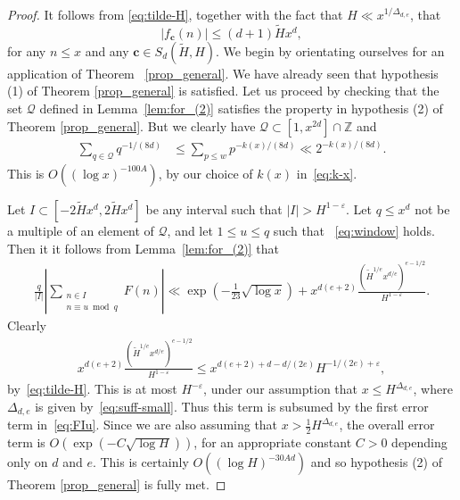 \documentclass[11pt,letterpaper]{amsart}
\renewcommand{\leq}{\leqslant}
\theoremstyle{definition}
\numberwithin{equation}{section}
\renewcommand{\c}{\mathbf{c}}
\newcommand{\ve}{\varepsilon}
\DeclareMathOperator{\n}{N}
\newcommand{\0}{\mathbf{0}}
\begin{document}
\begin{proof}
It follows from 
\eqref{eq:tilde-H}, together with the fact that $H\ll x^{1/\Delta_{d,e}}$,   that 
$$
|f_{\mathbf{c}}(n)|\leq (d+1)\tilde H x^d,
$$ 
for any $n\leq x$ and any $\c\in S_d(\tilde H, H)$.
We begin by orientating ourselves for an application of   Theorem 
~\ref{prop_general}. 
We have already seen that  hypothesis (1)
 of Theorem 
\ref{prop_general} is satisfied. 
Let us proceed by checking that the  set $\mathcal{Q}$ 
defined in Lemma~\ref{lem:for_(2)} satisfies the property in hypothesis (2) of 
Theorem 
\ref{prop_general}. 
But we clearly have 
$\mathcal{Q}\subset [1,x^{2d}]\cap \mathbb{Z}$ and
\begin{align*}
 \sum_{q\in \mathcal{Q}}
q^{-1/(8d)}
&\leq \sum_{p\leq w} p^{-k(x)/(8d)}\ll
2^{-k(x)/(8d)}.
\end{align*}
This is 
$O((\log x)^{-100A})$, by our choice of $k(x)$
in~\eqref{eq:k-x}. 

Let
$I\subset [-2\tilde H x^d, 2\tilde H x^d]$
be any interval  such that $|I|> H^{1-\varepsilon}$.
Let 
 $q\leq x^{d}$ not be  a multiple of an element of $\mathcal{Q}$, and let $1\leq u\leq q$ such that 
~\eqref{eq:window} holds. Then it  it follows from
Lemma~\ref{lem:for_(2)}  that 
\begin{align}\label{eq:FIu}
\frac{q}{|I|}
\left|\sum_{\substack{n\in I\\n\equiv u\bmod q}}F(n)\right|
\ll 
\exp\left(-\tfrac{1}{23}\sqrt{\log x}\right)
+
x^{d(e+2)} \frac{(\tilde H^{1/e}x^{d/e})^{e-1/2}}{H^{1-\ve}}.
\end{align}
Clearly 
\begin{align*}
x^{d(e+2)} \frac{(\tilde H^{1/e}x^{d/e})^{e-1/2}}{H^{1-\ve}}
\leq 
x^{d(e+2)+d-d/(2e)}{H^{-1/(2e)+\ve}},
\end{align*}
by~\eqref{eq:tilde-H}. 
This is at most $H^{-\varepsilon}$,  
under our assumption that $x\leq H^{\Delta_{d,e}}$, 
where $\Delta_{d,e}$ is given by~\eqref{eq:suff-small}. 
Thus this term is subsumed by the first error term in~\eqref{eq:FIu}.
Since  we are also  assuming that 
$x>\frac{1}{2}H^{\Delta_{d,e}}$,
the overall error term is $O(\exp(-C\sqrt{\log H}))$, 
for an appropriate constant $C>0$ depending only on $d$ and $e$.
This 
 is certainly $O((\log H)^{-30Ad})$ and so  hypothesis (2) of 
Theorem 
\ref{prop_general} is fully met. 



\end{proof}
\end{document}
